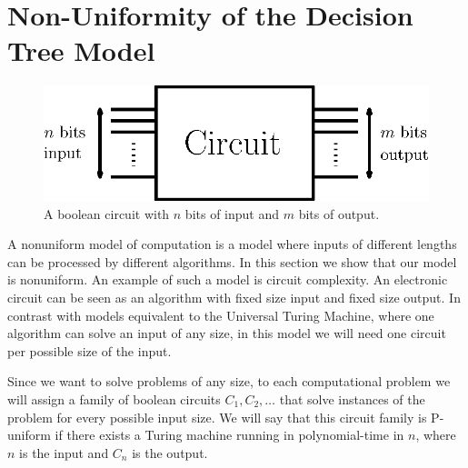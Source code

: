 \section{Non-Uniformity of the Decision Tree Model}
\label{tree:sorting:nonuniformity}

\begin{figure}
\center
\includegraphics[height=0.2\textheight]{fig/sorting/model/circuit}
\caption{A boolean circuit with \(n\) bits of input and \(m\) bits of output.}
\label{fig:sorting:nonuniformity:circuit}
\end{figure}

A nonuniform model of computation is a model where inputs of different
lengths can be processed by different algorithms. In this section we show that
our model is nonuniform. An example of such a model is circuit complexity. An
electronic circuit can be seen as an algorithm with fixed size input and fixed
size output. In contrast with models equivalent to the Universal Turing
Machine, where one algorithm can solve an input of any size, in this model we
will need one circuit per possible size of the input.

Since we want to solve problems of any size, to each computational problem we
will assign a family of boolean circuits \(C_1,C_2,\ldots\) that solve
instances of the problem for every possible input size. We will say that this
circuit family is P-uniform if there exists a Turing machine running in
polynomial-time in \(n\), where \(n\) is the input and \(C_n\) is the output.

